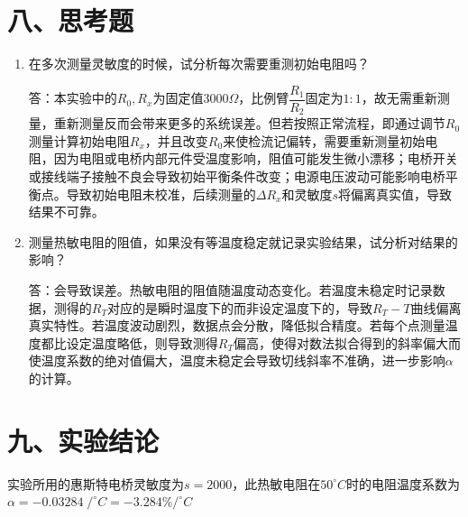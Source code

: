 \documentclass[11pt]{article}
\begin{document}
\section*{八、思考题}

\begin{enumerate}
    \item 在多次测量灵敏度的时候，试分析每次需要重测初始电阻吗？
    
    答：本实验中的$R_0, R_x$为固定值$3000\Omega$，比例臂$\dfrac{R_1}{R_2}$固定为$1:1$，故无需重新测量，重新测量反而会带来更多的系统误差。但若按照正常流程，即通过调节$R_0$测量计算初始电阻$R_x$，并且改变$R_0$来使检流记偏转，需要重新测量初始电阻，因为电阻或电桥内部元件受温度影响，阻值可能发生微小漂移；电桥开关或接线端子接触不良会导致初始平衡条件改变；电源电压波动可能影响电桥平衡点。导致初始电阻未校准，后续测量的$\Delta R_x$和灵敏度$s$将偏离真实值，导致结果不可靠。
    \item 测量热敏电阻的阻值，如果没有等温度稳定就记录实验结果，试分析对结果的影响？
    
    答：会导致误差。热敏电阻的阻值随温度动态变化。若温度未稳定时记录数据，测得的$R_T$对应的是瞬时温度下的而非设定温度下的，导致$R_T-T$曲线偏离真实特性。若温度波动剧烈，数据点会分散，降低拟合精度。若每个点测量温度都比设定温度略低，则导致测得$R_T$偏高，使得对数法拟合得到的斜率偏大而使温度系数的绝对值偏大，温度未稳定会导致切线斜率不准确，进一步影响$\alpha$的计算。
\end{enumerate}

\section*{九、实验结论}

实验所用的惠斯特电桥灵敏度为$s=2000$，此热敏电阻在$50^{\circ}C$时的电阻温度系数为$\alpha=-0.03284\;/^{\circ}C=-3.284\%/^{\circ}C$
\end{document}
